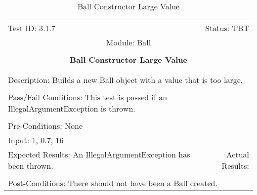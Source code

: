 \documentclass[titlepage]{article}
\begin{document}
\begin{center}%
\begin{table}[h!]
\begin{tabular}{|l r|}\hline&\\[-2mm]
	Test ID: 3.1.7	&Status: TBT\\[-3mm]
	\multicolumn{2}{|c|}{Module: Ball}\\&\\
	\multicolumn{2}{|c|}{\textbf{\large{Ball Constructor Large Value}}}\\&\\\hline&\\[-3mm]
	\multicolumn{2}{|p{\textwidth}|}{Description: Builds a new Ball object with a value that is too large.}\\[1mm]\hline&\\[-3mm]
	\multicolumn{2}{|p{\textwidth}|}{Pass/Fail Conditions: This test is passed if an IllegalArgumentException is thrown.}\\[1mm]\hline&\\[-3mm]
	\multicolumn{2}{|p{\textwidth}|}{Pre-Conditions: None}\\[4mm]
	\multicolumn{2}{|p{\textwidth}|}{Input: 1, 0.7, 16}\\[2mm]\hline
	\multicolumn{1}{|p{0.49\textwidth}}{Expected Results: An IllegalArgumentException has been thrown.}	&\multicolumn{1}{|p{0.45\textwidth}|}{Actual Results:}\\\hline&\\[-3mm]
	\multicolumn{2}{|p{\textwidth}|}{Post-Conditions: There should not have been a Ball created.}\\\hline
\end{tabular}
\caption{Ball Constructor Large Value}
\end{table}
\end{center}
\newpage
\end{document}
